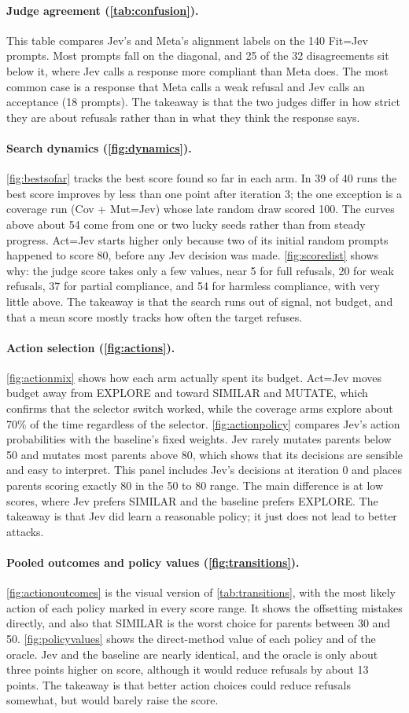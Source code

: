 \documentclass{article}
\newcommand{\para}[1]{\paragraph{#1}}
\begin{document}
\para{Judge agreement (\autoref{tab:confusion}).}
This table compares Jev's and Meta's alignment labels on the 140 Fit=Jev prompts.
Most prompts fall on the diagonal, and 25 of the 32 disagreements sit below it, where Jev calls a response more compliant than Meta does.
The most common case is a response that Meta calls a weak refusal and Jev calls an acceptance (18 prompts).
The takeaway is that the two judges differ in how strict they are about refusals rather than in what they think the response says.

\para{Search dynamics (\autoref{fig:dynamics}).}
\autoref{fig:bestsofar} tracks the best score found so far in each arm.
In 39 of 40 runs the best score improves by less than one point after iteration 3; the one exception is a coverage run (Cov + Mut=Jev) whose late random draw scored 100.
The curves above about 54 come from one or two lucky seeds rather than from steady progress.
Act=Jev starts higher only because two of its initial random prompts happened to score 80, before any Jev decision was made.
\autoref{fig:scoredist} shows why: the judge score takes only a few values, near 5 for full refusals, 20 for weak refusals, 37 for partial compliance, and 54 for harmless compliance, with very little above.
The takeaway is that the search runs out of signal, not budget, and that a mean score mostly tracks how often the target refuses.

\para{Action selection (\autoref{fig:actions}).}
\autoref{fig:actionmix} shows how each arm actually spent its budget.
Act=Jev moves budget away from EXPLORE and toward SIMILAR and MUTATE, which confirms that the selector switch worked, while the coverage arms explore about 70\% of the time regardless of the selector.
\autoref{fig:actionpolicy} compares Jev's action probabilities with the baseline's fixed weights.
Jev rarely mutates parents below 50 and mutates most parents above 80, which shows that its decisions are sensible and easy to interpret.
This panel includes Jev's decisions at iteration 0 and places parents scoring exactly 80 in the 50 to 80 range.
The main difference is at low scores, where Jev prefers SIMILAR and the baseline prefers EXPLORE.
The takeaway is that Jev did learn a reasonable policy; it just does not lead to better attacks.

\para{Pooled outcomes and policy values (\autoref{fig:transitions}).}
\autoref{fig:actionoutcomes} is the visual version of \autoref{tab:transitions}, with the most likely action of each policy marked in every score range.
It shows the offsetting mistakes directly, and also that SIMILAR is the worst choice for parents between 30 and 50.
\autoref{fig:policyvalues} shows the direct-method value of each policy and of the oracle.
Jev and the baseline are nearly identical, and the oracle is only about three points higher on score, although it would reduce refusals by about 13 points.
The takeaway is that better action choices could reduce refusals somewhat, but would barely raise the score.
\end{document}
